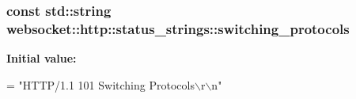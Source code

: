 \subsubsection[{\texorpdfstring{switching\+\_\+protocols}{switching_protocols}}]{\setlength{\rightskip}{0pt plus 5cm}const std\+::string websocket\+::http\+::status\+\_\+strings\+::switching\+\_\+protocols}\hypertarget{namespacewebsocket_1_1http_1_1status__strings_a9b60f1719697fb464b7063cb436e1d75}{}\label{namespacewebsocket_1_1http_1_1status__strings_a9b60f1719697fb464b7063cb436e1d75}
{\bfseries Initial value\+:}
\begin{DoxyCode}
=
                \textcolor{stringliteral}{"HTTP/1.1 101 Switching Protocols\(\backslash\)r\(\backslash\)n"}
\end{DoxyCode}
